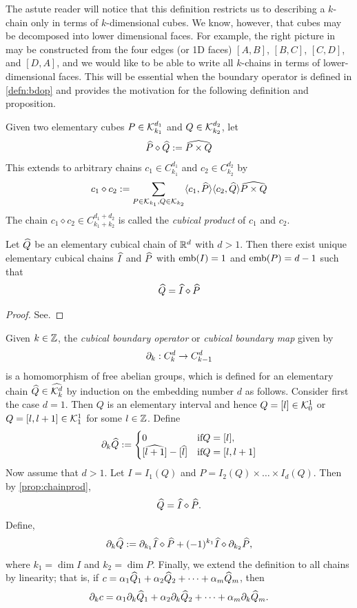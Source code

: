 The astute reader will notice that this definition restricts us to describing a $k$-chain only in terms of $k$-dimensional cubes. We know, however, that cubes may be decomposed into lower dimensional faces. For example, the right picture in  may be constructed from the four edges (or 1D faces) $[A,B]$, $[B,C]$, $[C,D]$, and $[D,A]$, and we would like to be able to write all $k$-chains in terms of lower-dimensional faces. This will be essential when the boundary operator is defined in \ref{defn:bdop} and provides the motivation for the following definition and proposition.

\begin{defn}
	Given two elementary cubes $P \in \mathcal{K}_{k_1}^{d_1} $ and $ Q \in \mathcal{K}_{k_2}^{d_2} $, let
	$$ \widehat{P} \diamond \widehat{Q} := \widehat{ P \times Q } $$
	This extends to arbitrary chains $ c_1 \in C_{k_1}^{d_1} $ and $ c_2 \in C_{k_2}^{d_2} $ by
	$$ c_1 \diamond c_2 := \sum_{P \in \mathcal{K}_{k_1}, Q \in \mathcal{K}_{k_2} } \langle c_1, \widehat{P} \rangle \langle c_2, \widehat{Q} \rangle \widehat{ P \times Q} $$
	The chain $ c_1 \diamond c_2 \in C_{k_1 + k_2}^{d_1 + d_2} $ is called the \textit{cubical product} of $c_1$ and $c_2$.
\end{defn}

\begin{prop} \label{prop:chainprod}
	Let $\widehat{Q}$ be an elementary cubical chain of $\mathbb{R}^d$ with $d > 1$. Then there exist unique elementary cubical chains $\widehat{I}$ and $\widehat{P}$ with $\mathord{\mathrm{emb}(I)} = 1$ and $\mathord{\mathrm{emb}(P)} = d - 1$ such that
	$$ \widehat{Q} = \widehat{I} \diamond \widehat{P} $$
\end{prop}
%
\begin{proof}
	See.
\end{proof}

\begin{defn} \label{defn:bdop}
	Given $k \in \mathbb{Z}$, the \textit{cubical boundary operator} or \textit{cubical boundary map} given by
	$$ \partial_k : C_k^d \rightarrow C_{k-1}^d $$
	is a homomorphism of free abelian groups, which is defined for an elementary chain $\widehat{Q} \in \widehat{\mathcal{K}^{d}_k}$ by induction on the embedding number $d$ as follows. Consider first the case $d = 1$. Then $Q$ is an elementary interval and hence $Q = [l] \in \mathcal{K}_0^1$ or $Q = [l, l+1] \in \mathcal{K}_1^1$ for some $l \in \mathbb{Z}$. Define
		$$ \del_k \Qhat :=
			\begin{cases}
				0	& \text{if} Q = [l], \\
				[ \wh{l+1} ] - [\wh{l}]	& \text{if} Q = [l, l+1]
			\end{cases}$$
	Now assume that $d > 1$. Let $I = I_1(Q)$ and $P = I_2(Q) \times \ldots \times I_d(Q)$. Then by \ref{prop:chainprod},
	$$ \widehat{Q} = \widehat{I} \diamond \widehat{P}. $$
	Define,
	$$\partial_k \widehat{Q} := \partial_{k_1} \widehat{I} \diamond \widehat{P} + (-1)^{k_1} \widehat{I} \diamond \partial_{k_2} \widehat{P}, $$
	where $k_1 = \dim{I}$ and $k_2 = \dim{P}$. Finally, we extend the definition to all chains by linearity; that is, if $c = \alpha_1 \widehat{Q}_1 + \alpha_2 \widehat{Q}_2 + \cdots + \alpha_m \widehat{Q}_m$, then
	$$ \partial_k c = \alpha_1 \partial_k \widehat{Q}_1 + \alpha_2 \partial_k \widehat{Q}_2 + \cdots + \alpha_m \partial_k \widehat{Q}_m. $$
\end{defn}

